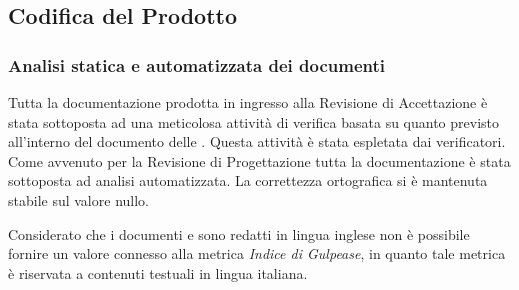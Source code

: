 
\newpage
\subsection{Codifica del Prodotto} 

\subsubsection{Analisi statica e automatizzata dei documenti}\label{resocontoProgettazioneArchitetturale}
Tutta la documentazione prodotta in ingresso alla Revisione di Accettazione è stata sottoposta ad una meticolosa attività di verifica
basata su quanto previsto all'interno del documento delle .
Questa attività è stata espletata dai verificatori.
Come avvenuto per la Revisione di Progettazione tutta la documentazione è stata sottoposta ad analisi automatizzata.
La correttezza ortografica si è mantenuta stabile sul valore nullo.

Considerato che i documenti  e   sono redatti in lingua inglese
non è possibile fornire un valore connesso alla metrica \textit{Indice di Gulpease}, in quanto tale metrica è riservata a contenuti 
testuali in lingua italiana.


